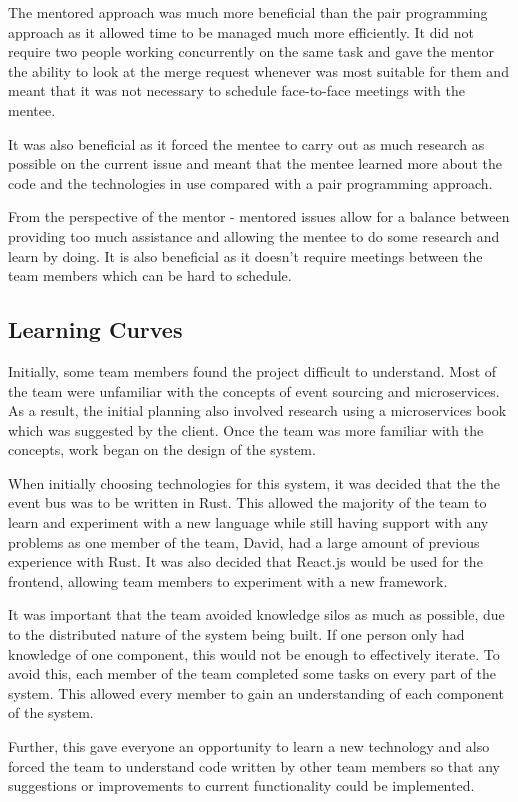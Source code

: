 \documentclass{l3proj}
\begin{document}
The mentored approach was much more beneficial than the pair programming approach as it allowed time to be managed much more efficiently. It did not require two people working concurrently on the same task and gave the mentor the ability to look at the merge request whenever was most suitable for them and meant that it was not necessary to schedule face-to-face meetings with the mentee.

It was also beneficial as it forced the mentee to carry out as much research as possible on the current issue and meant that the mentee learned more about the code and the technologies in use compared with a pair programming approach.

From the perspective of the mentor - mentored issues allow for a balance between providing too much assistance and allowing the mentee to do some research and learn by doing. It is also beneficial as it doesn't require meetings between the team members which can be hard to schedule.

\subsection{Learning Curves}
Initially, some team members found the project difficult to understand. Most of the team were unfamiliar with the concepts of event sourcing and microservices. As a result, the initial planning also involved research using a microservices book \cite{microservices} which was suggested by the client. Once the team was more familiar with the concepts, work began on the design of the system.

When initially choosing technologies for this system, it was decided that the the event bus was to be written in Rust. This allowed the majority of the team to learn and experiment with a new language while still having support with any problems as one member of the team, David, had a large amount of previous experience with Rust. It was also decided that React.js would be used for the frontend, allowing team members to experiment with a new framework.

It was important that the team avoided knowledge silos as much as possible, due to the distributed nature of the system being built. If one person only had knowledge of one component, this would not be enough to effectively iterate. To avoid this, each member of the team completed some tasks on every part of the system. This allowed every member to gain an understanding of each component of the system.

Further, this gave everyone an opportunity to learn a new technology and also forced the team to understand code written by other team members so that any suggestions or improvements to current functionality could be implemented.
\end{document}
